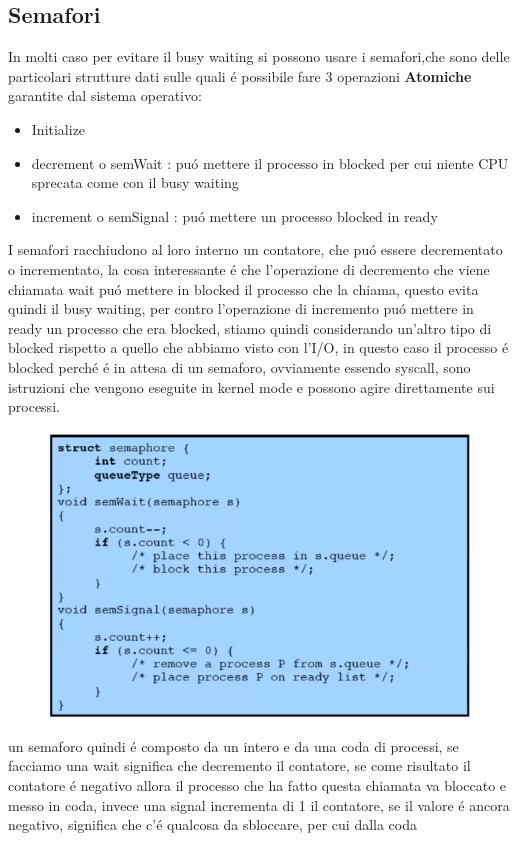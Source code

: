 \subsection{Semafori}
In molti caso per evitare il busy waiting si possono usare i semafori,che sono delle particolari strutture dati sulle quali é
possibile fare 3 operazioni \textbf{Atomiche} garantite dal sistema operativo:
\begin{itemize}
    \item Initialize
    \item decrement o semWait : puó mettere il processo in blocked per cui niente CPU sprecata come con il busy waiting
    \item increment o semSignal : puó mettere un processo blocked in ready
\end{itemize}
I semafori racchiudono al loro interno un contatore, che puó essere decrementato o incrementato, la cosa interessante é che l'operazione di decremento che viene chiamata wait
puó mettere in blocked il processo che la chiama, questo evita quindi il busy waiting, per contro l'operazione di incremento puó mettere in ready un processo che era blocked,
stiamo quindi considerando un'altro tipo di blocked rispetto a quello che abbiamo visto con l'I/O, in questo caso il processo é blocked perché é in attesa di un semaforo,
ovviamente essendo syscall, sono istruzioni che vengono eseguite in kernel mode e possono agire direttamente sui processi.
\begin{figure}[H]
    \centering
    \includegraphics[width=0.7\linewidth]{immagini/ImplementazioneSemaforo}
\end{figure}
un semaforo quindi é composto da un intero e da una coda di processi, se facciamo una wait significa che decremento il contatore,
se come risultato il contatore é negativo allora il processo che ha fatto questa chiamata va bloccato e messo in coda, invece una
signal incrementa di 1 il contatore, se il valore é ancora negativo, significa che c'é qualcosa da sbloccare, per cui dalla coda
